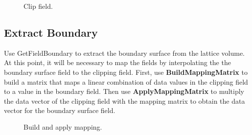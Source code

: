 \documentclass[fleqn,11pt,openany]{book}
\begin{document}
\begin{figure}[H]
\caption{Clip field.}
\label{fig:clipfield}
\end{figure}

\subsection{Extract Boundary}\label{clipvol}

Use GetFieldBoundary to extract the boundary surface from the lattice volume.
At this point, it will be necessary to map the fields by interpolating the the boundary surface field to the clipping field.
First, use \textbf{BuildMappingMatrix} to build a matrix that maps a linear combination of data values in the clipping field to a value in the boundary field. Then use \textbf{ApplyMappingMatrix} to multiply the data vector of the clipping field with the mapping matrix to obtain the data vector for the boundary surface field.

\begin{figure}[H]
\caption{Build and apply mapping.}
\label{fig:mappingmatrix}
\end{figure}
\end{document}
